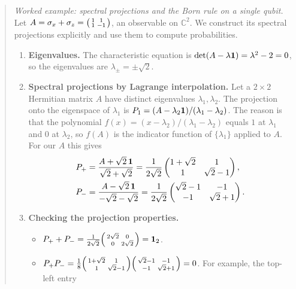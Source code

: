 \begin{quote}
\textit{Worked example: spectral projections and the Born rule on a single qubit.} Let
$A = \sigma_x + \sigma_z = \begin{psmallmatrix} 1 & 1 \\ 1 & -1 \end{psmallmatrix}$, an observable on
$\mathbb C^2$. We construct its spectral projections explicitly and use them to compute probabilities.
\begin{enumerate}
\item \textbf{Eigenvalues.} The characteristic equation is $\det(A - \lambda\mathbf{1}) = \lambda^2 - 2 = 0$, so
the eigenvalues are $\lambda_\pm = \pm\sqrt{2}$.
\item \textbf{Spectral projections by Lagrange interpolation.} Let a $2\times2$ Hermitian matrix $A$ have
distinct eigenvalues $\lambda_1, \lambda_2$. The projection onto the eigenspace of $\lambda_1$ is
$P_1 = (A - \lambda_2\mathbf{1})/(\lambda_1 - \lambda_2)$. The reason is that the polynomial
$f(x)=(x-\lambda_2)/(\lambda_1-\lambda_2)$ equals $1$ at $\lambda_1$ and $0$ at $\lambda_2$, so $f(A)$ is the
indicator function of $\{\lambda_1\}$ applied to $A$. For our $A$ this gives
\begin{align}
P_+ &= \frac{A + \sqrt2\,\mathbf{1}}{\sqrt2 + \sqrt2}
= \frac{1}{2\sqrt2}\begin{pmatrix} 1+\sqrt2 & 1 \\ 1 & \sqrt2-1 \end{pmatrix} , \notag\\
P_- &= \frac{A - \sqrt2\,\mathbf{1}}{-\sqrt2 - \sqrt2}
= \frac{1}{2\sqrt2}\begin{pmatrix} \sqrt2-1 & -1 \\ -1 & \sqrt2+1 \end{pmatrix} . \notag
\end{align}
\item \textbf{Checking the projection properties.}
\begin{itemize}
\item $P_+ + P_- = \frac{1}{2\sqrt2}\begin{psmallmatrix} 2\sqrt2 & 0 \\ 0 & 2\sqrt2 \end{psmallmatrix} = \mathbf{1}_2$.
\item $P_+ P_- = \frac{1}{8}\begin{psmallmatrix} 1+\sqrt2 & 1 \\ 1 & \sqrt2-1 \end{psmallmatrix}
\begin{psmallmatrix} \sqrt2-1 & -1 \\ -1 & \sqrt2+1 \end{psmallmatrix} = 0$. For example, the top-left entry

\end{itemize}
\end{enumerate}
\end{quote}
